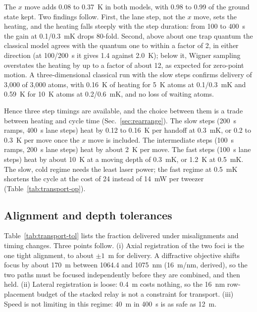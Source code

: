 The $x$ move adds 0.08 to 0.37~\textmu K in both models, with 0.98 to 0.99 of the ground state kept. Two findings follow. First, the lane step, not the $x$ move, sets the heating, and the heating falls steeply with the step duration: from 100 to 400~\textmu s the gain at 0.1/0.3~mK drops 80-fold. Second, above about one trap quantum the classical model agrees with the quantum one to within a factor of 2, in either direction (at 100/200~\textmu s it gives 1.4 against 2.0~\textmu K); below it, Wigner sampling overstates the heating by up to a factor of about 12, as expected for zero-point motion. A three-dimensional classical run with the slow steps confirms delivery of 3,000 of 3,000 atoms, with 0.16~\textmu K of heating for 5~\textmu K atoms at 0.1/0.3~mK and 0.59~\textmu K for 10~\textmu K atoms at 0.2/0.6~mK, and no loss of waiting atoms.

Hence three step timings are available, and the choice between them is a trade between heating and cycle time (Sec.~\ref{sec:rearrange}). The slow steps (200~\textmu s ramps, 400~\textmu s lane steps) heat by 0.12 to 0.16~\textmu K per handoff at 0.3~mK, or 0.2 to 0.3~\textmu K per move once the $x$ move is included. The intermediate steps (100~\textmu s ramps, 200~\textmu s lane steps) heat by about 2~\textmu K per move. The fast steps (100~\textmu s lane steps) heat by about 10~\textmu K at a moving depth of 0.3~mK, or 1.2~\textmu K at 0.5~mK. The slow, cold regime needs the least laser power; the fast regime at 0.5~mK shortens the cycle at the cost of 24 instead of 14~mW per tweezer (Table~\ref{tab:transport-op}).

\subsection{Alignment and depth tolerances}\label{sec:transport-tol}

Table~\ref{tab:transport-tol} lists the fraction delivered under misalignments and timing changes. Three points follow. (i) Axial registration of the two foci is the one tight alignment, to about $\pm1$~\textmu m for delivery. A diffractive objective shifts focus by about 170~\textmu m between 1064.4 and 1075~nm (16~\textmu m/nm, derived), so the two paths must be focused independently before they are combined, and then held. (ii) Lateral registration is loose: 0.4~\textmu m costs nothing, so the 16~nm row-placement budget of the stacked relay is not a constraint for transport. (iii) Speed is not limiting in this regime: 40~\textmu m in 400~\textmu s is as safe as 12~\textmu m.

